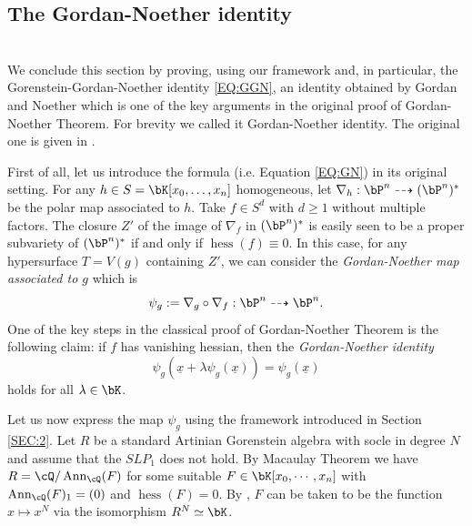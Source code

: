 \documentclass[a4paper,11pt]{amsart}
\DeclareMathOperator{\Ann}{Ann}
\DeclareMathOperator{\hess}{hess}
\begin{document}


\subsection{The Gordan-Noether identity}
\label{SUBSEC:GNI}
$\,$\\

We conclude this section by proving, using our framework and, in particular, the Gorenstein-Gordan-Noether identity \eqref{EQ:GGN}, an identity obtained by Gordan and Noether which is one of the key arguments in the original proof of Gordan-Noether Theorem. For brevity we called it Gordan-Noether identity. The original one is given in \cite[7.3.4]{Rus16}.
\medskip

First of all, let us introduce the formula (i.e. Equation \eqref{EQ:GN}) in its original setting. For any $h\in S=\bK[x_0,\dots,x_n]$ homogeneous, let $\nabla_h:\bP^n\dashrightarrow (\bP^n)^*$ be the polar map associated to $h$. Take $f\in S^d$ with $d\geq 1$ without multiple factors. 
The closure $Z'$ of the image of $\nabla_f$ in $(\bP^n)^*$ is easily seen to be a proper subvariety of $(\bP^n)^*$ if and only if $\hess(f)\equiv 0$. In this case, for any hypersurface $T=V(g)$ containing $Z'$, we can consider the \emph{Gordan-Noether map associated to $g$} which is 
$$\psi_g:=\nabla_g\circ \nabla_f :\bP^n\dashrightarrow\bP^n.$$
One of the key steps in the classical proof of Gordan-Noether Theorem is the following claim: if $f$ has vanishing hessian, then the {\it Gordan-Noether identity} \begin{equation}
\label{EQ:GN}
\psi_g(\underline{x}+\lambda\psi_g(\underline{x}))=\psi_g(\underline{x})
\end{equation}
holds for all $\lambda\in \bK$.
\vspace{2mm}

Let us now express the map $\psi_g$ using the framework introduced in Section \ref{SEC:2}. 
Let $R$ be a standard Artinian Gorenstein algebra with socle in degree $N$ and assume that the $SLP_1$ does not hold. By Macaulay Theorem we have $R=\cQ/\Ann_{\cQ}(F)$ for some suitable $F\in \bK[x_0,\cdots, x_n]$ with $\Ann_\cQ(F)_1=(0)$ and $\hess(F)=0$. By \cite[Lemma 3.74]{bookLef}, $F$ can be taken to be the function $x\mapsto x^N$ via the isomorphism $R^N\simeq \bK$.
\vspace{2mm}
\end{document}
